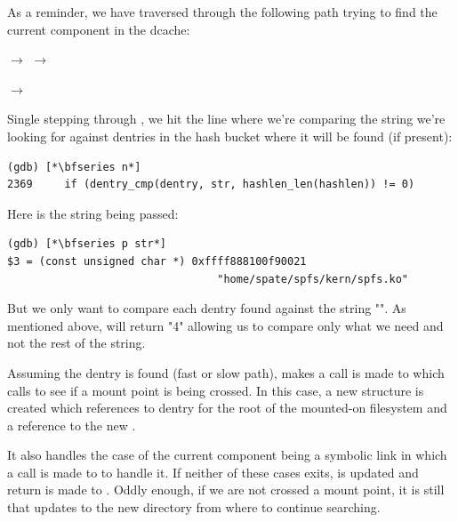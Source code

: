 As a reminder, we have traversed through the following path trying to find the current component in the dcache:

\small
\bigskip 
{} $\rightarrow$   $\rightarrow$  

\vspace{1pt}
\hspace{1.37in}$\rightarrow$  
    
\bigskip
\normalsize
\noindent
Single stepping through  , we hit the line where we're comparing the string we're looking for against dentries in the hash bucket where it will be found (if present):

\begin{lstlisting}
(gdb) [*\bfseries n*]
2369     if (dentry_cmp(dentry, str, hashlen_len(hashlen)) != 0)
\end{lstlisting}

\noindent
Here is the string being passed:

\begin{lstlisting}
(gdb) [*\bfseries p str*]
$3 = (const unsigned char *) 0xffff888100f90021 
                                 "home/spate/spfs/kern/spfs.ko"
\end{lstlisting}

\noindent
But we only want to compare each dentry found against the string "". As mentioned above,  will return "4" allowing us to compare only what we need and not the rest of the string.

Assuming the dentry is found (fast or slow path),  makes a call is made to  which calls  to see if a mount point is being crossed. In this case, a new  structure is created which references to dentry for the root of the mounted-on filesystem and a reference to the new . 

It also handles the case of the current component being a symbolic link in which a call is made to  to handle it. If neither of these cases exits,  is updated and return is made to . Oddly enough, if we are not crossed a mount point, it is still  that updates  to the new directory from where to continue searching.


